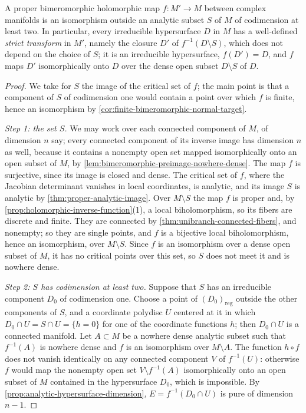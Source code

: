 \begin{proposition}\label{prop:smooth-bimeromorphic-divisor-locus}
A proper bimeromorphic holomorphic map $f\colon M'\to M$ between complex manifolds is an isomorphism outside an analytic subset $S$ of $M$ of codimension at least two. In particular, every irreducible hypersurface $D$ in $M$ has a well-defined \emph{strict transform} in $M'$, namely the closure $D'$ of $f^{-1}(D\setminus S)$, which does not depend on the choice of $S$; it is an irreducible hypersurface, $f(D')=D$, and $f$ maps $D'$ isomorphically onto $D$ over the dense open subset $D\setminus S$ of $D$.
\end{proposition}
\begin{proof}
We take for $S$ the image of the critical set of $f$; the main point is that a component of $S$ of codimension one would contain a point over which $f$ is finite, hence an isomorphism by \cref{cor:finite-bimeromorphic-normal-target}.

\emph{Step 1: the set $S$.} We may work over each connected component of $M$, of dimension $n$ say; every connected component of its inverse image has dimension $n$ as well, because it contains a nonempty open set mapped isomorphically onto an open subset of $M$, by \cref{lem:bimeromorphic-preimage-nowhere-dense}. The map $f$ is surjective, since its image is closed and dense. The critical set of $f$, where the Jacobian determinant vanishes in local coordinates, is analytic, and its image $S$ is analytic by \cref{thm:proper-analytic-image}. Over $M\setminus S$ the map $f$ is proper and, by \cref{prop:holomorphic-inverse-function}(1), a local biholomorphism, so its fibers are discrete and finite. They are connected by \cref{thm:unibranch-connected-fibers}, and nonempty; so they are single points, and $f$ is a bijective local biholomorphism, hence an isomorphism, over $M\setminus S$. Since $f$ is an isomorphism over a dense open subset of $M$, it has no critical points over this set, so $S$ does not meet it and is nowhere dense.

\emph{Step 2: $S$ has codimension at least two.} Suppose that $S$ has an irreducible component $D_0$ of codimension one. Choose a point of $(D_0)_{\mathrm{reg}}$ outside the other components of $S$, and a coordinate polydisc $U$ centered at it in which $D_0\cap U=S\cap U=\{h=0\}$ for one of the coordinate functions $h$; then $D_0\cap U$ is a connected manifold. Let $A\subset M$ be a nowhere dense analytic subset such that $f^{-1}(A)$ is nowhere dense and $f$ is an isomorphism over $M\setminus A$. The function $h\circ f$ does not vanish identically on any connected component $V$ of $f^{-1}(U)$: otherwise $f$ would map the nonempty open set $V\setminus f^{-1}(A)$ isomorphically onto an open subset of $M$ contained in the hypersurface $D_0$, which is impossible. By \cref{prop:analytic-hypersurface-dimension}, $E=f^{-1}(D_0\cap U)$ is pure of dimension $n-1$.


\end{proof}
